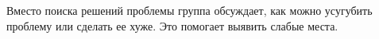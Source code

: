 Вместо поиска решений проблемы группа обсуждает, как можно усугубить проблему или сделать ее хуже. Это помогает выявить слабые места.
